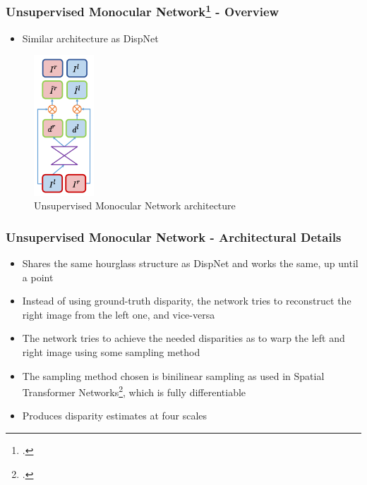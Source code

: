 \documentclass{beamer}
\begin{document}
\begin{frame}
\frametitle{Unsupervised Monocular Network\footcite{DBLP:journals/corr/GodardAB16} - Overview}
\center
\begin{itemize}
	\item Similar architecture as DispNet
\end{itemize}
\begin{figure}
    \centering
        \includegraphics[width=0.2\textwidth, height=0.5\textheight]{monodepth.png}
        \caption{Unsupervised Monocular Network architecture}
    \end{figure}
\end{frame}

\begin{frame}
\frametitle{Unsupervised Monocular Network - Architectural Details}
\center
\begin{itemize}
	\item Shares the same hourglass structure as DispNet and works the same, up until a point
	\item Instead of using ground-truth disparity, the network tries to reconstruct the right image from the left one, and vice-versa
	\item The network tries to achieve the needed disparities as to warp the left and right image using some sampling method
	\item The sampling method chosen is binilinear sampling as used in Spatial Transformer Networks\footcite{DBLP:journals/corr/JaderbergSZK15}, which is fully differentiable
	\item Produces disparity estimates at four scales
\end{itemize}
\end{frame}
\end{document}
